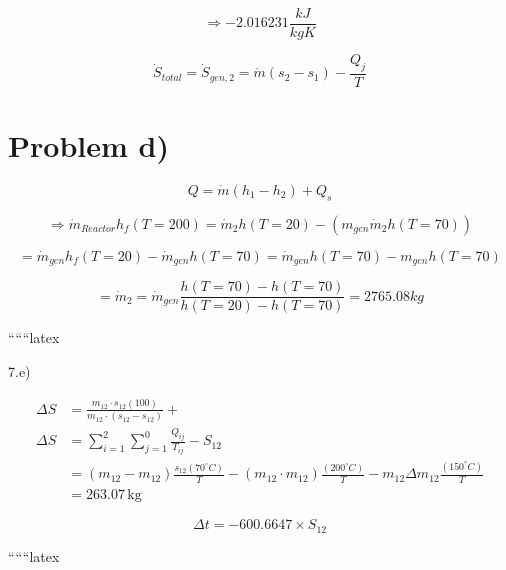 \begin{equation*}
\Rightarrow -2.016231 \frac{kJ}{kgK}
\end{equation*}

\begin{equation*}
\dot{S}_{total} = \dot{S}_{gen,2} = \dot{m} \left( s_{2} - s_{1} \right) - \frac{Q_{j}}{T}
\end{equation*}

\section*{Problem d)}

\begin{equation*}
Q = \dot{m} (h_{1} - h_{2}) + Q_{s}
\end{equation*}

\begin{equation*}
\Rightarrow \dot{m}_{Reactor} h_{f} (T = 200) = \dot{m}_{2} h (T = 20) - (m_{gen} \dot{m}_{2} h (T = 70))
\end{equation*}

\begin{equation*}
= \dot{m}_{gen} h_{f} (T = 20) - \dot{m}_{gen} h (T = 70) = \dot{m}_{gen} h (T = 70) - m_{gen} h (T = 70)
\end{equation*}

\begin{equation*}
= \dot{m}_{2} = \dot{m}_{gen} \frac{h (T = 70) - h (T = 70)}{h (T = 20) - h (T = 70)} = 2765.08 kg
\end{equation*}

``````latex


7.e)

\begin{align*}
\Delta S &= \frac{m_{12} \cdot s_{12}(100)}{m_{12} \cdot (s_{12}-s_{12})} + \\
\Delta S &= \sum_{i=1}^{2} \sum_{j=1}^{0} \frac{Q_{ij}}{T_{ij}} - S_{12} \\
&= (m_{12} - m_{12}) \frac{s_{12}(70^\circ C)}{T} - (m_{12} \cdot m_{12}) \frac{(200^\circ C)}{T} - m_{12} \Delta m_{12} \frac{(150^\circ C)}{T} \\
&= 263.07 \, \text{kg}
\end{align*}

\[
\Delta t = -600.6647 \times S_{12}
\]

``````latex


